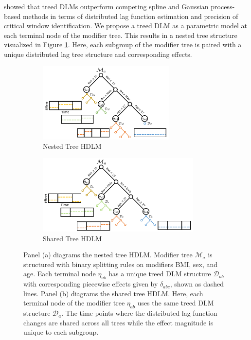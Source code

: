 \documentclass[12pt]{article}
\begin{document}
\cite{Mork2023EstimatingPairs} showed that treed DLMs outperform competing spline and Gaussian process-based methods in terms of distributed lag function estimation and precision of critical window identification. We propose a treed DLM as a parametric model at each terminal node of the modifier tree. This results in a nested tree structure visualized in Figure \ref{fig:nested_hdlm}. Here, each subgroup of the modifier tree is paired with a unique distributed lag tree structure and corresponding effects.

\begin{figure}
    \centering
    \begin{subfigure}[b]{.44\textwidth}
    \includegraphics[height=4cm]{img/nested_tree_diagram.PNG}
    \caption{Nested Tree HDLM}
    \label{fig:nested_hdlm}
    \end{subfigure}
    \begin{subfigure}[b]{.54\textwidth}
    \includegraphics[height=4cm]{img/shared_tree_diagram.PNG}
    \caption{Shared Tree HDLM}
    \label{fig:shared_hdlm}
    \end{subfigure}
    \caption{Panel (a) diagrams the nested tree HDLM. Modifier tree $\mathcal{M}_a$ is structured with binary splitting rules on modifiers BMI, sex, and age. Each terminal node $\eta_{ab}$ has a unique treed DLM structure $\mathcal{D}_{ab}$ with corresponding piecewise effects given by $\delta_{abc}$, shown as dashed lines. Panel (b) diagrams the shared tree HDLM. Here, each terminal node of the modifier tree $\eta_{ab}$ uses the same treed DLM structure $\mathcal{D}_a$. The time points where the distributed lag function changes are shared across all trees while the effect magnitude is unique to each subgroup.}
\end{figure}
\end{document}
